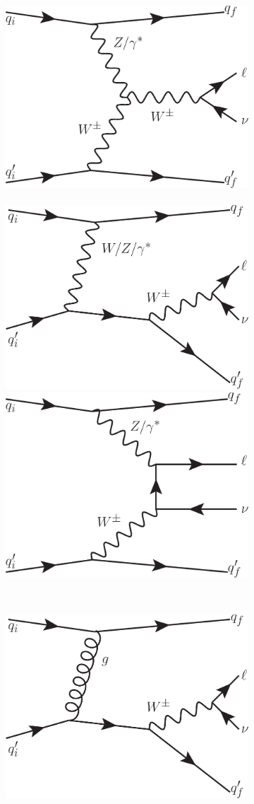 \documentclass{PoS}
\begin{document}
\begin{figure}[t!]
  \begin{subfigure}[t]{0.74\textwidth}
    \centering
    \includegraphics[width=.35\textwidth]{STDM-2014-11/fig_01a.pdf}~~
    \includegraphics[width=.35\textwidth]{STDM-2014-11/fig_01b.pdf}\\ \vspace{5mm}
    \includegraphics[width=.35\textwidth]{STDM-2014-11/fig_01c.pdf}
    \caption{}
  \end{subfigure}%
  ~
  \begin{subfigure}[t]{0.26\textwidth}
    \centering
    \includegraphics[width=.99\textwidth]{STDM-2014-11/fig_02a.pdf}\\ \vspace{5mm}

\end{subfigure}
\end{figure}
\end{document}
